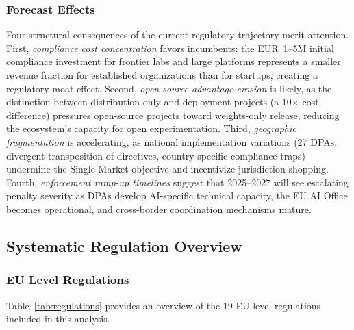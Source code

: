\documentclass[11pt,a4paper]{article}
\begin{document}
\subsubsection{Forecast Effects}

Four structural consequences of the current regulatory trajectory merit attention. First, \emph{compliance cost concentration} favors incumbents: the EUR~1--5M initial compliance investment for frontier labs and large platforms represents a smaller revenue fraction for established organizations than for startups, creating a regulatory moat effect. Second, \emph{open-source advantage erosion} is likely, as the distinction between distribution-only and deployment projects (a 10$\times$ cost difference) pressures open-source projects toward weights-only release, reducing the ecosystem's capacity for open experimentation. Third, \emph{geographic fragmentation} is accelerating, as national implementation variations (27 DPAs, divergent transposition of directives, country-specific compliance traps) undermine the Single Market objective and incentivize jurisdiction shopping. Fourth, \emph{enforcement ramp-up timelines} suggest that 2025--2027 will see escalating penalty severity as DPAs develop AI-specific technical capacity, the EU AI Office becomes operational, and cross-border coordination mechanisms mature.

\subsection{Systematic Regulation Overview}

\subsubsection{EU Level Regulations}

Table~\ref{tab:regulations} provides an overview of the 19 EU-level regulations included in this analysis.
\end{document}
